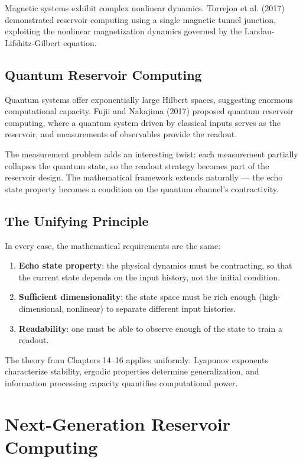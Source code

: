 Magnetic systems exhibit complex nonlinear dynamics. Torrejon et al. (2017) demonstrated reservoir computing using a single magnetic tunnel junction, exploiting the nonlinear magnetization dynamics governed by the Landau-Lifshitz-Gilbert equation.

\subsection{Quantum Reservoir Computing}\label{sec:17.4.4}

Quantum systems offer exponentially large Hilbert spaces, suggesting enormous computational capacity. Fujii and Nakajima (2017) proposed quantum reservoir computing, where a quantum system driven by classical inputs serves as the reservoir, and measurements of observables provide the readout.

The measurement problem adds an interesting twist: each measurement partially collapses the quantum state, so the readout strategy becomes part of the reservoir design. The mathematical framework extends naturally --- the echo state property becomes a condition on the quantum channel's contractivity.

\subsection{The Unifying Principle}\label{sec:17.4.5}

In every case, the mathematical requirements are the same:

\begin{enumerate}[nosep]
  \item \textbf{Echo state property}: the physical dynamics must be contracting, so that the current state depends on the input history, not the initial condition.
  \item \textbf{Sufficient dimensionality}: the state space must be rich enough (high-dimensional, nonlinear) to separate different input histories.
  \item \textbf{Readability}: one must be able to observe enough of the state to train a readout.
\end{enumerate}

The theory from Chapters 14--16 applies uniformly: Lyapunov exponents characterize stability, ergodic properties determine generalization, and information processing capacity quantifies computational power.


\bigskip


\section{Next-Generation Reservoir Computing}\label{sec:17.5}

